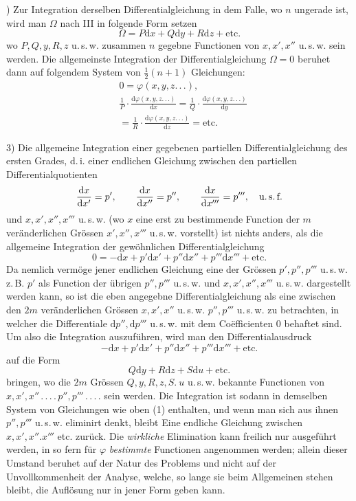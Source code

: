 ) Zur Integration derselben Differentialgleichung in dem Falle, wo $n$ ungerade ist, wird man $\Omega$ nach III in folgende Form setzen
\[
\Omega=P\mathrm{d}x+Q\mathrm{d}y+R\mathrm{d}z+\mathrm{etc.}
\]
wo $P,Q,y,R,z$ u.\,s.\,w. zusammen $n$ gegebne Functionen von $x,x',x''$ u.\,s.\,w.
sein werden. Die allgemeinste Integration der Differentialgleichung $\Omega=0$ beruhet dann auf folgendem System von $\frac12(n+1)$ Gleichungen:
\[
\begin{aligned}&0=\varphi(x,y,z.\,.\,.),\\&
\frac1P\cdot\frac{\mathrm{d}\varphi(x,y,z.\,.\,.)}{\mathrm{d}x}
=\frac1Q\cdot\frac{\mathrm{d}\varphi(x,y,z.\,.\,.)}{\mathrm{d}y}
\\&=\frac1R\cdot\frac{\mathrm{d}\varphi(x,y,z.\,.\,.)}{\mathrm{d}z}=\mathrm{etc.}\end{aligned}
\]
\par{}
3) Die allgemeine Integration einer gegebenen partiellen Differentialgleichung
des ersten Grades, d.\,i. einer endlichen Gleichung zwischen den partiellen Differentialquotienten
\[
\frac{\mathrm{d}x}{\mathrm{d}x'}=p',\qquad
\frac{\mathrm{d}x}{\mathrm{d}x''}=p'',\qquad
\frac{\mathrm{d}x}{\mathrm{d}x'''}=p''',\quad\text{u.\,s.\,f.}
\]
und $x,x',x'',x'''$ u.\,s.\,w. (wo $x$ eine erst zu bestimmende Function der $m$ veränderlichen Grössen $x',x'',x'''$ u.\,s.\,w. vorstellt) ist nichts anders, als die allgemeine Integration der gewöhnlichen Differentialgleichung
\[
0=-\mathrm{d}x+p'\mathrm{d}x'+p''\mathrm{d}x''+p'''\mathrm{d}x'''+\text{etc.}
\]
Da nemlich vermöge jener endlichen Gleichung eine der Grössen $p',p'',p'''$ u.\,s.\,w.
z.\,B. $p'$ als Function der übrigen $p'',p'''$ u.\,s.\,w. und $x,x',x'',x'''$ u.\,s.\,w. dargestellt werden kann, so ist die eben angegebne Differentialgleichung als eine zwischen den $2m$ veränderlichen Grössen $x,x',x''$ u.\,s.\,w. $p'',p'''$ u.\,s.\,w. zu betrachten, in welcher die Differentiale $\mathrm{d}p'',\mathrm{d}p'''$ u.\,s.\,w. mit dem Coëfficienten $0$ behaftet sind. Um also die Integration auszuführen, wird man den Differentialausdruck
\[
-\mathrm{d}x+p'\mathrm{d}x'+p''\mathrm{d}x''+p'''\mathrm{d}x'''+\text{etc.}
\]
auf die Form
\[
Q\mathrm{d}y+R\mathrm{d}z+S\mathrm{d}u+\text{etc.}
\]
bringen, wo die $2m$ Grössen $Q,y,R,z,S.\ u$ u.\,s.\,w. bekannte Functionen von
$x,x',x''\, .\, .\, .\, .\, p'',p'''\, .\, .\, .\, .$ sein werden. Die Integration ist sodann in demselben
System von Gleichungen wie oben (1) enthalten, und wenn man sich aus ihnen
$p'',p'''$ u.\,s.\,w. eliminirt denkt, bleibt Eine endliche Gleichung zwischen $x,x',x''.x'''$
etc. zurück. Die \emph{wirkliche} Elimination kann freilich nur ausgeführt werden, in so
fern für $\varphi$ \emph{bestimmte} Functionen angenommen werden; allein dieser Umstand beruhet auf der Natur des Problems und nicht auf der Unvollkommenheit der Analyse, welche, so lange sie beim Allgemeinen stehen bleibt, die Auflösung nur in
jener Form geben kann.

